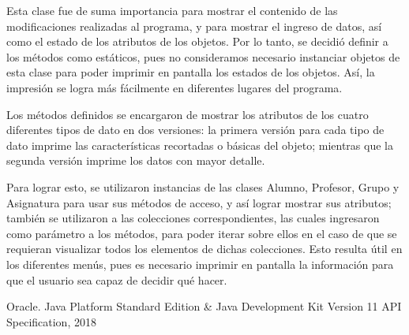 \documentclass[11pt]{article}
\begin{document}
Esta clase fue de suma importancia para mostrar el contenido de las 
modificaciones realizadas al programa, y para mostrar el ingreso de 
datos, así como el estado de los atributos de los objetos. Por lo 
tanto, se decidió definir a los métodos como estáticos, pues no 
consideramos necesario instanciar objetos de esta clase para poder 
imprimir en pantalla los estados de los objetos. Así, la impresión se 
logra más fácilmente en diferentes lugares del programa. 

\par

Los métodos definidos se encargaron de mostrar los atributos de los 
cuatro diferentes tipos de dato en dos versiones: la primera versión 
para cada tipo de dato imprime las características recortadas o 
básicas del objeto; mientras que la segunda versión imprime los datos 
con mayor detalle. 
\par
Para lograr esto, se utilizaron instancias de las clases Alumno, 
Profesor, Grupo y Asignatura para usar sus métodos de acceso, y así 
lograr mostrar sus atributos; también se utilizaron a las colecciones 
correspondientes, las cuales ingresaron como parámetro a los métodos, 
para poder iterar sobre ellos en el caso de que se requieran 
visualizar todos los elementos de dichas colecciones. Esto resulta 
útil en los diferentes menús, pues es necesario imprimir en pantalla 
la información para que el usuario sea capaz de decidir qué hacer.


\begin{thebibliography}{0}
 Oracle. Java Platform Standard Edition \& Java Development Kit
Version 11 API Specification, 2018
\end{thebibliography}
\end{document}

